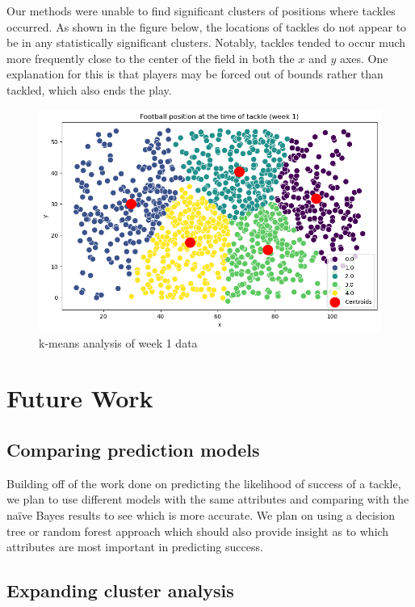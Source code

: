 \documentclass[bibtex, sigconf, hyperref={colorlinks=true,linkcolor=blue,urlcolor=blue}]{acmart}
\begin{document}
Our methods were unable to find significant clusters of positions where tackles
occurred. As shown in the figure below, the locations of tackles do not appear
to be in any statistically significant clusters. Notably, tackles tended to
occur much more frequently close to the center of the field in both the $x$ and
$y$ axes. One explanation for this is that players may be forced out of bounds
rather than tackled, which also ends the play.

\begin{figure}[h]
  \centering
  \includegraphics[width=\linewidth]{k-means}
  \caption{k-means analysis of week 1 data}
\end{figure}

\section{Future Work}

\subsection{Comparing prediction models}

Building off of the work done on predicting the likelihood of success of a
tackle, we plan to use different models with the same attributes and comparing
with the na\"ive Bayes results to see which is more accurate.
We plan on using a decision tree or random forest approach which should also
provide insight as to which attributes are most important in predicting
success.

\subsection{Expanding cluster analysis}
\end{document}
